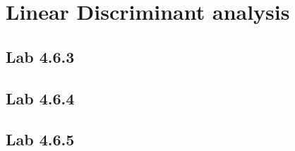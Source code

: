 \chapter{Linear Discriminant analysis}
\label{chp:lindisana}

\section{Lab 4.6.3}
\section{Lab 4.6.4}
\section{Lab 4.6.5}